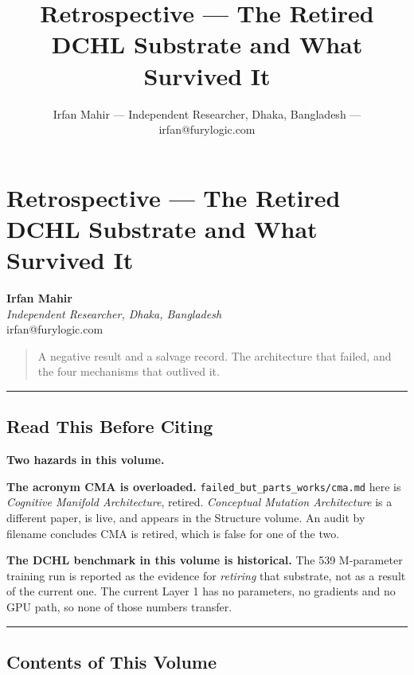 \documentclass[
  11pt,
  a4paper,
]{article}
\title{Retrospective --- The Retired DCHL Substrate and What Survived
It}
\author{Irfan Mahir --- Independent Researcher, Dhaka, Bangladesh ---
irfan@furylogic.com}
\date{}
\begin{document}
\maketitle

{
\hypersetup{linkcolor=}
\setcounter{tocdepth}{2}
\tableofcontents
}
\section{Retrospective --- The Retired DCHL Substrate and What Survived
It}\label{retrospective-the-retired-dchl-substrate-and-what-survived-it}

\textbf{Irfan Mahir}\\
\emph{Independent Researcher, Dhaka, Bangladesh}\\
irfan@furylogic.com

\begin{quote}
A negative result and a salvage record. The architecture that failed,
and the four mechanisms that outlived it.
\end{quote}

\begin{center}\rule{0.5\linewidth}{0.5pt}\end{center}

\subsection{Read This Before Citing}\label{read-this-before-citing}

\textbf{Two hazards in this volume.}

\textbf{The acronym CMA is overloaded.}
\texttt{failed\_but\_parts\_works/cma.md} here is \emph{Cognitive
Manifold Architecture}, retired. \emph{Conceptual Mutation Architecture}
is a different paper, is live, and appears in the Structure volume. An
audit by filename concludes CMA is retired, which is false for one of
the two.

\textbf{The DCHL benchmark in this volume is historical.} The 539
M-parameter training run is reported as the evidence for \emph{retiring}
that substrate, not as a result of the current one. The current Layer 1
has no parameters, no gradients and no GPU path, so none of those
numbers transfer.

\begin{center}\rule{0.5\linewidth}{0.5pt}\end{center}

\subsection{Contents of This Volume}\label{contents-of-this-volume}
\end{document}
